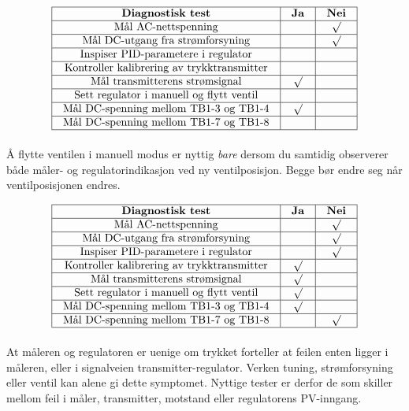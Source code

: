 $$\vbox{\offinterlineskip
\halign{\strut
\vrule \quad\hfil # \ \hfil & 
\vrule \quad\hfil # \ \hfil & 
\vrule \quad\hfil # \ \hfil \vrule \cr
\noalign{\hrule}
%
{\bf Diagnostisk test} & {\bf Ja} & {\bf Nei} \cr
%
\noalign{\hrule}
%
Mål AC-nettspenning &  & $\surd$ \cr
%
\noalign{\hrule}
%
Mål DC-utgang fra strømforsyning &  & $\surd$ \cr
%
\noalign{\hrule}
%
Inspiser PID-parametere i regulator &  &  \cr
%
\noalign{\hrule}
%
Kontroller kalibrering av trykktransmitter &  &  \cr
%
\noalign{\hrule}
%
Mål transmitterens strømsignal & $\surd$ &  \cr
%
\noalign{\hrule}
%
Sett regulator i manuell og flytt ventil &  &  \cr
%
\noalign{\hrule}
%
Mål DC-spenning mellom TB1-3 og TB1-4 & $\surd$ &  \cr
%
\noalign{\hrule}
%
Mål DC-spenning mellom TB1-7 og TB1-8 &  &  \cr
%
\noalign{\hrule}
} %
}$$ %

Å flytte ventilen i manuell modus er nyttig {\it bare} dersom du samtidig observerer både måler- og regulatorindikasjon ved ny ventilposisjon. Begge bør endre seg når ventilposisjonen endres.








$$\vbox{\offinterlineskip
\halign{\strut
\vrule \quad\hfil # \ \hfil & 
\vrule \quad\hfil # \ \hfil & 
\vrule \quad\hfil # \ \hfil \vrule \cr
\noalign{\hrule}
%
{\bf Diagnostisk test} & {\bf Ja} & {\bf Nei} \cr
%
\noalign{\hrule}
%
Mål AC-nettspenning &  & $\surd$ \cr
%
\noalign{\hrule}
%
Mål DC-utgang fra strømforsyning &  & $\surd$ \cr
%
\noalign{\hrule}
%
Inspiser PID-parametere i regulator &  & $\surd$ \cr
%
\noalign{\hrule}
%
Kontroller kalibrering av trykktransmitter & $\surd$ &  \cr
%
\noalign{\hrule}
%
Mål transmitterens strømsignal & $\surd$ &  \cr
%
\noalign{\hrule}
%
Sett regulator i manuell og flytt ventil & $\surd$ &  \cr
%
\noalign{\hrule}
%
Mål DC-spenning mellom TB1-3 og TB1-4 & $\surd$ &  \cr
%
\noalign{\hrule}
%
Mål DC-spenning mellom TB1-7 og TB1-8 &  & $\surd$ \cr
%
\noalign{\hrule}
} %
}$$ %

At måleren og regulatoren er uenige om trykket forteller at feilen enten ligger i måleren, eller i signalveien transmitter-regulator. Verken tuning, strømforsyning eller ventil kan alene gi dette symptomet. Nyttige tester er derfor de som skiller mellom feil i måler, transmitter, motstand eller regulatorens PV-inngang.




